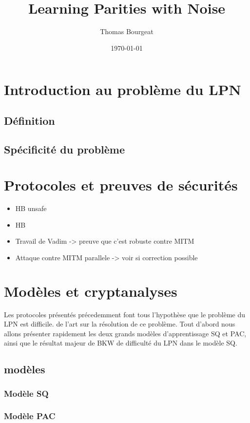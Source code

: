 \documentclass{article}		%
\begin{document}
\title{Learning Parities with Noise}
\author{Thomas Bourgeat }
\date\today
\maketitle
\section{Introduction au problème du LPN}

\subsection{Définition}
\subsection{Spécificité du problème}

\section{Protocoles et preuves de sécurités}

\begin{itemize}
\item HB unsafe
\item HB
\item Travail de Vadim -> preuve que c'est robuste contre MITM
\item Attaque contre MITM parallele -> voir si correction possible 
\end{itemize}


\section{Modèles et cryptanalyses}
Les protocoles présentés précedemment font tous l'hypothèse que le
problème du LPN est difficile. 
de l'art sur la résolution de ce problème. Tout d'abord nous allons
présenter rapidement les deux grands modèles d'apprentissage SQ et PAC, ainsi que le
résultat majeur de BKW de difficulté du LPN dans le modèle SQ. 

\subsection{modèles}
\subsubsection{Modèle SQ}

\subsubsection{Modèle PAC}
\end{document}
